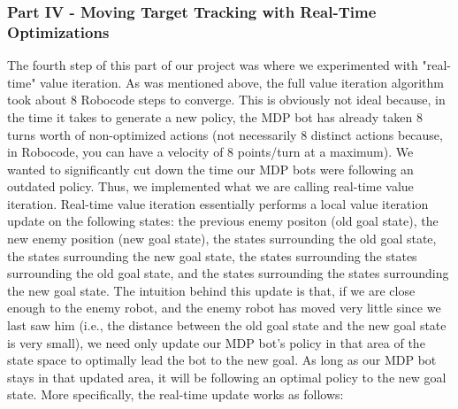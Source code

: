 \documentclass{aiaa-tc}%
\begin{document}
\subsubsection{Part IV - Moving Target Tracking with Real-Time Optimizations}
The fourth step of this part of our project was where we experimented with "real-time" value iteration. As was mentioned above, the full value iteration algorithm took about 8 Robocode steps to converge. This is obviously not ideal because, in the time it takes to generate a new policy, the MDP bot has already taken 8 turns worth of non-optimized actions (not necessarily 8 distinct actions because, in Robocode, you can have a velocity of 8 points/turn at a maximum). We wanted to significantly cut down the time our MDP bots were following an outdated policy.  Thus, we implemented what we are calling real-time value iteration. Real-time value iteration essentially performs a local value iteration update on the following states: the previous enemy positon (old goal state), the new enemy position (new goal state), the states surrounding the old goal state, the states surrounding the new goal state, the states surrounding the states surrounding the old goal state, and the states surrounding the states surrounding the new goal state. The intuition behind this update is that, if we are close enough to the enemy robot, and the enemy robot has moved very little since we last saw him (i.e., the distance between the old goal state and the new goal state is very small), we need only update our MDP bot's policy in that area of the state space to optimally lead the bot to the new goal. As long as our MDP bot stays in that updated area, it will be following an optimal policy to the new goal state. More specifically, the real-time update works as follows:
\end{document}
